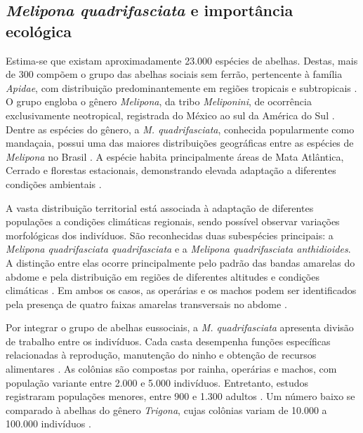 \documentclass[12pt]{unisenaiclass}
\begin{document}
\subsection{\textit{Melipona quadrifasciata} e importância ecológica}
Estima-se que existam aproximadamente 23.000 espécies de abelhas. Destas, mais de 300 compõem o grupo das abelhas sociais sem ferrão, pertencente à família \textit{Apidae}, com distribuição predominantemente em regiões tropicais e subtropicais \cite{carvalhozilse2011meliponicultura}. O grupo engloba o gênero \textit{Melipona}, da tribo \textit{Meliponini}, de ocorrência exclusivamente neotropical, registrada do México ao sul da América do Sul \cite{kerr1948geografia,pedro2014stingless}. Dentre as espécies do gênero, a \textit{M. quadrifasciata}, conhecida popularmente como mandaçaia, possui uma das maiores distribuições geográficas entre as espécies de \textit{Melipona} no Brasil \cite{mourekerr1950distribuicao}. A espécie habita principalmente áreas de Mata Atlântica, Cerrado e florestas estacionais, demonstrando elevada adaptação a diferentes condições ambientais \cite{melo2009colorpattern}.

A vasta distribuição territorial está associada à adaptação de diferentes populações a condições climáticas regionais, sendo possível observar variações morfológicas dos indivíduos. São reconhecidas duas subespécies principais: a \textit{Melipona quadrifasciata quadrifasciata} e a \textit{Melipona quadrifasciata anthidioides}. A distinção entre elas ocorre principalmente pelo padrão das bandas amarelas do abdome e pela distribuição em regiões de diferentes altitudes e condições climáticas \cite{mourekerr1950distribuicao,melo1987listras}. Em ambos os casos, as operárias e os machos podem ser identificados pela presença de quatro faixas amarelas transversais no abdome \cite{melo1987listras}.

Por integrar o grupo de abelhas eussociais, a \textit{M. quadrifasciata} apresenta divisão de trabalho entre os indivíduos. Cada casta desempenha funções específicas relacionadas à reprodução, manutenção do ninho e obtenção de recursos alimentares \cite{michener2007bees}. As colônias são compostas por rainha, operárias e machos, com população variante entre 2.000 e 5.000 indivíduos. Entretanto, estudos registraram populações menores, entre 900 e 1.300 adultos \cite{brito2013caste,faquinello2013correlacao}. Um número baixo se comparado à abelhas do gênero \textit{Trigona}, cujas colônias variam de 10.000 a 100.000 indivíduos \cite{michener2007bees}.
\end{document}
